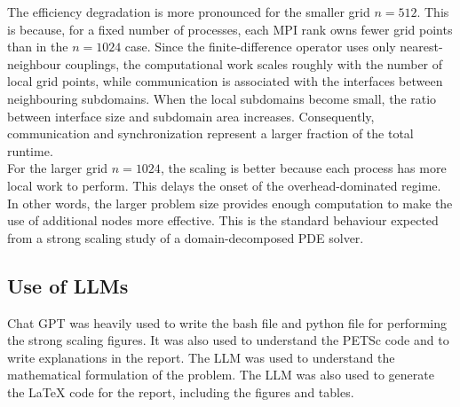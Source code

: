 \documentclass[unicode,10pt,a4paper,oneside,numbers=endperiod,openany]{scrartcl}
\begin{document}
The efficiency degradation is more pronounced for the smaller grid
\(n=512\). This is because, for a fixed number of processes, each MPI rank owns
fewer grid points than in the \(n=1024\) case. Since the finite-difference
operator uses only nearest-neighbour couplings, the computational work scales
roughly with the number of local grid points, while communication is associated
with the interfaces between neighbouring subdomains. When the local subdomains
become small, the ratio between interface size and subdomain area increases.
Consequently, communication and synchronization represent a larger fraction of
the total runtime.\\

For the larger grid \(n=1024\), the scaling is better because each process has
more local work to perform. This delays the onset of the overhead-dominated
regime. In other words, the larger problem size provides enough computation to
make the use of additional nodes more effective. This is the standard behaviour
expected from a strong scaling study of a domain-decomposed PDE solver.\\

\subsection{Use of LLMs}
Chat GPT was heavily used to write the bash file and python file for performing the strong scaling figures. It was also used to understand the PETSc code and to write explanations in the report. The LLM was used to understand the mathematical formulation of the problem. The LLM was also used to generate the LaTeX code for the report, including the figures and tables.
\end{document}
